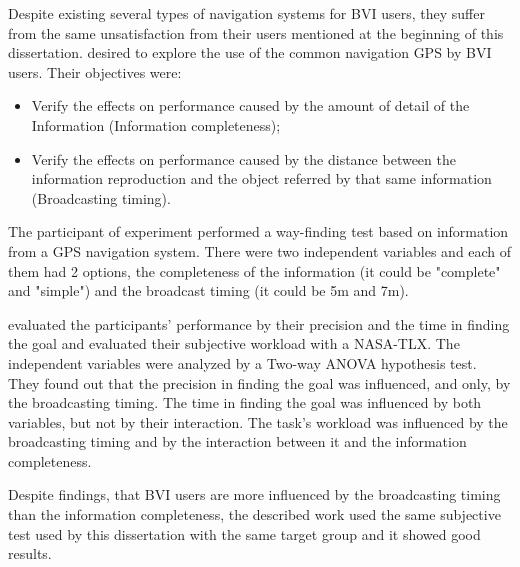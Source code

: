 Despite existing several types of navigation systems for BVI users, they suffer from the same unsatisfaction from their users mentioned at the beginning of this dissertation.  desired to explore the use of the common navigation GPS by BVI users. Their objectives were:

\begin{itemize}
    \item Verify the effects on performance caused by the amount of detail of the Information (Information completeness);
    \item Verify the effects on performance caused by the distance between the information reproduction and the object referred by that same information (Broadcasting timing).
\end{itemize}

The participant of \citeauthor{yang2014design} experiment performed a way-finding test based on information from a GPS navigation system. There were two independent variables and each of them had 2 options, the completeness of the information (it could be "complete" and "simple") and the broadcast timing (it could be 5m and 7m).

\citeauthor{yang2014design} evaluated the participants' performance by their precision and the time in finding the goal and evaluated their subjective workload with a NASA-TLX. The independent variables were analyzed by a Two-way ANOVA hypothesis test. They found out that the precision in finding the goal was influenced, and only, by the broadcasting timing. The time in finding the goal was influenced by both variables, but not by their interaction. The task's workload was influenced by the broadcasting timing and by the interaction between it and the information completeness.

Despite \citeauthor{yang2014design} findings, that BVI users are more influenced by the broadcasting timing than the information completeness, the described work used the same subjective test used by this dissertation with the same target group and it showed good results.